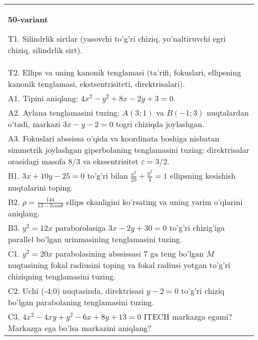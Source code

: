 \documentclass{article}
\begin{document}
\begin{tabular}{m{17cm}}
\textbf{50-variant}
\newline

T1. Silindrlik sirtlar (yasovchi to'g'ri chiziq, yo'naltiruvchi egri chiziq, silindrlik sirt).\\

T2. Ellips va uning kanonik tenglamasi (ta'rifi, fokuslari, ellipsning kanonik tenglamasi, ekstsentrisiteti, direktrisalari).\\

A1. Tipini aniqlang: $4x^{2}-y^{2}+8x-2y+3=0$.\\

A2. Aylana tenglamasini tuzing: $A(3;1)$ va $B(-1;3)$ nuqtalardan o'tadi, markazi $3x-y-2=0$ togri chiziqda joylashgan.\\

A3. Fokuslari abssissa o'qida va koordinata boshiga nisbatan simmetrik joylashgan giperbolaning tenglamasini tuzing: direktrisalar orasidagi masofa $8/3$ va ekssentrisitet $\varepsilon=3/2$.\\

B1. $3x + 10y - 25 = 0$ to'g'ri bilan $\frac{x^{2}}{25} + \frac{y^{2}}{4} = 1$ ellipsning kesishish nuqtalarini toping.  \\

B2. $\rho = \frac{144}{13 - 5cos\theta}$ ellips ekanligini ko'rsating va uning yarim o'qlarini aniqlang.\\

B3. $y^{2} = 12x$ paraborolasiga $3x - 2y + 30 = 0$ to'g'ri chizig'iga parallel bo'lgan urinmasining tenglamasini tuzing.  \\

C1. $y^{2} = 20x$ parabolasining abssissasi 7 ga teng bo'lgan $M$ nuqtasining fokal radiusini toping va fokal radiusi yotgan to'g'ri chiziqning tenglamasini tuzing.  \\

C2. Uchi (-4;0) nuqtasinda, direktrisasi $y - 2 = 0$ to'g'ri chiziq bo'lgan parabolaning tenglamasini tuzing.\\

C3. $4x^{2} - 4xy + y^{2} - 6x + 8y + 13 = 0$ ITECH markazga egami? Markazga ega bo'lsa markazini aniqlang?  \\

\end{tabular}
\vspace{1cm}
\end{document}
